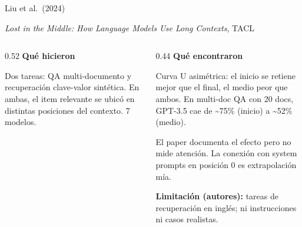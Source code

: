 \documentclass[aspectratio=169, 11pt]{beamer}
\begin{document}
\begin{frame}{Liu et al.\ (2024)}

\textit{Lost in the Middle: How Language Models Use Long Contexts}, TACL

\vspace{0.4em}

\begin{columns}[T]
\begin{column}{0.52\textwidth}
\textbf{Qu\'e hicieron}

\vspace{0.3em}
\footnotesize
Dos tareas: QA multi-documento y recuperaci\'on clave-valor sint\'etica. En ambas, el item relevante se ubic\'o en distintas posiciones del contexto. 7 modelos.

\vspace{0.4em}

\end{column}

\begin{column}{0.44\textwidth}
\textbf{Qu\'e encontraron}

\vspace{0.3em}
\footnotesize
\alert{Curva U asim\'etrica}: el inicio se retiene mejor que el final, el medio peor que ambos. En multi-doc QA con 20 docs, GPT-3.5 cae de \textasciitilde75\% (inicio) a \textasciitilde52\% (medio).

\vspace{0.6em}

El paper documenta el efecto pero \alert{no mide atenci\'on}. La conexi\'on con system prompts en posici\'on 0 es extrapolaci\'on m\'ia.

\vspace{0.6em}

\textbf{Limitaci\'on (autores):} tareas de recuperaci\'on en ingl\'es; ni instrucciones ni casos realistas.
\end{column}
\end{columns}

\end{frame}
\end{document}
